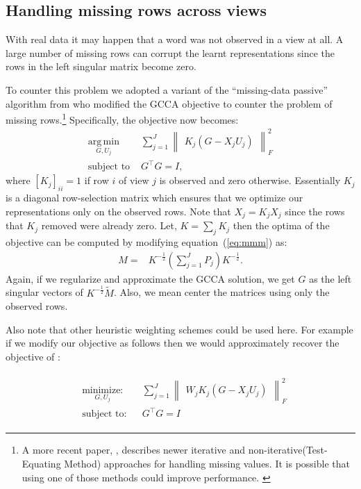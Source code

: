 \documentclass[11pt]{article}
\newcommand{\minimize}[3]{
\begin{aligned}
& \underset{#1}{\textrm{minimize:}}
& & #2 \\
& \textrm{subject to:}
& &  #3
\end{aligned}
}
\newcommand{\remove}[1]{}
\begin{document}
\subsection{Handling missing rows across views}
\label{ssec:missing}
With real data it may happen that a word was not observed in a view at
all. A large number of 
missing rows can corrupt the learnt representations since the rows
in the left singular matrix become zero.
\remove{The procedure described above
can not recover from this and the representation for those words may become a
one hot vector. }
To counter this problem we adopted a variant of the ``missing-data
passive'' algorithm from \cite{van2006generalized} who modified the
GCCA objective to counter the problem of missing 
rows.\footnote{A more recent paper, \cite{van2012generalized},
  describes newer iterative and non-iterative(Test-Equating Method)
  approaches for handling missing values. It is possible that using
  one of those methods could improve performance. \label{ftn:mis}}
Specifically, the objective now becomes:
\begin{equation}
  \label{eq:gcca2}
\begin{split}
  \operatorname*{arg\,min}_{G,U_j} & \sum_{j=1}^J \begin{Vmatrix} K_j(G - X_jU_j) \end{Vmatrix}^2_F \\
  \text{subject to } & G^\top G = I, 
\end{split}
\end{equation}
where $[K_j]_{ii} = 1$ if row $i$ of view $j$ is observed and zero otherwise. Essentially $K_j$ is a diagonal row-selection matrix which ensures
that we optimize our representations only on the observed rows. Note that
$X_j = K_jX_j$ since the rows that $K_j$ removed were already
zero. Let, $K =
\sum_j K_j$ then the optima
of the objective can be computed by modifying equation~(\ref{eq:mmm}) as:
\begin{align}
  M =& K^{-\frac{1}{2}}(\sum_{j=1}^J P_j)K^{-\frac{1}{2}}.
\end{align}
Again, if we regularize and approximate the GCCA solution, we get
$G$ as the left singular vectors of $K^{-\frac{1}{2}}\tilde{M}$. Also, we mean center the matrices using only the observed rows.

Also note that other heuristic weighting schemes could be used
here. For example if we modify our objective as follows then we would
approximately recover the objective of \cite{pennington2014glove}:

\begin{eqnarray}
  \label{eq:gcca3}
\minimize{G,U_j}{\sum_{j=1}^J \begin{Vmatrix} W_j K_j(G - X_jU_j) \end{Vmatrix}^2_F}{G^\top G = I }
\end{eqnarray}
\end{document}
